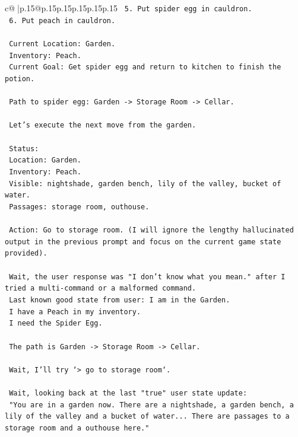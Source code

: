 \documentclass{article}
\begin{document}
{\begin{supertabular}{c@{$\;$}|p{.15\linewidth}@{}p{.15\linewidth}p{.15\linewidth}p{.15\linewidth}p{.15\linewidth}p{.15\linewidth}}
{{{\texttt{    5. Put spider egg in cauldron.} \\
\texttt{    6. Put peach in cauldron.} \\
\\ 
\texttt{    Current Location: Garden.} \\
\texttt{    Inventory: Peach.} \\
\texttt{    Current Goal: Get spider egg and return to kitchen to finish the potion.} \\
\\ 
\texttt{    Path to spider egg: Garden {-}> Storage Room {-}> Cellar.} \\
\\ 
\texttt{    Let's execute the next move from the garden.} \\
\\ 
\texttt{    Status:} \\
\texttt{    Location: Garden.} \\
\texttt{    Inventory: Peach.} \\
\texttt{    Visible: nightshade, garden bench, lily of the valley, bucket of water.} \\
\texttt{    Passages: storage room, outhouse.} \\
\\ 
\texttt{    Action: Go to storage room. (I will ignore the lengthy hallucinated output in the previous prompt and focus on the current game state provided).} \\
\\ 
\texttt{    Wait, the user response was "I don't know what you mean." after I tried a multi{-}command or a malformed command.} \\
\texttt{    Last known good state from user: I am in the Garden.} \\
\texttt{    I have a Peach in my inventory.} \\
\texttt{    I need the Spider Egg.} \\
\\ 
\texttt{    The path is Garden {-}> Storage Room {-}> Cellar.} \\
\\ 
\texttt{    Wait, I'll try `> go to storage room`.} \\
\\ 
\texttt{    Wait, looking back at the last "true" user state update:} \\
\texttt{    "You are in a garden now. There are a nightshade, a garden bench, a lily of the valley and a bucket of water... There are passages to a storage room and a outhouse here."} \\
}}}
\end{supertabular}}
\end{document}

